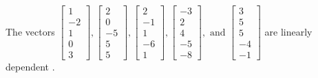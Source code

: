 \begin{exercise}
\begin{exerciseStatement}
  \end{exerciseStatement}
  \begin{exerciseAnswer}
   The vectors \(\left[\begin{array}{r}
1 \\
-2 \\
1 \\
0 \\
3
\end{array}\right] , \left[\begin{array}{r}
2 \\
0 \\
-5 \\
5 \\
5
\end{array}\right] , \left[\begin{array}{r}
2 \\
-1 \\
1 \\
-6 \\
1
\end{array}\right] , \left[\begin{array}{r}
-3 \\
2 \\
4 \\
-5 \\
-8
\end{array}\right] , \text{ and } \left[\begin{array}{r}
3 \\
5 \\
5 \\
-4 \\
-1
\end{array}\right]\) are 
  	 linearly dependent  .
  


  \end{exerciseAnswer}
\end{exercise}
